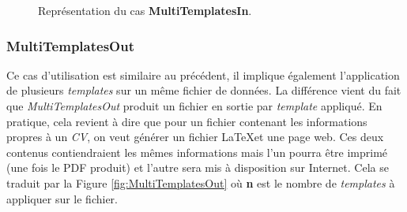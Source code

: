 				\begin{figure}
					\begin{center}
						\caption{Représentation du cas \textbf{MultiTemplatesIn}.}
						\label{fig:MultiTemplatesIn}
					\end{center}
				\end{figure}
				
			
			\subsubsection*{MultiTemplatesOut}
				Ce cas d'utilisation est similaire au précédent, il implique également l'application de plusieurs \textit{templates} sur un même fichier de données. La différence vient du fait que \textit{MultiTemplatesOut} produit un fichier en sortie par \textit{template} appliqué. En pratique, cela revient à dire que pour un fichier contenant les informations propres à un \textit{CV}, on veut générer un fichier \LaTeX et une page web. Ces deux contenus contiendraient les mêmes informations mais l'un pourra être imprimé (une fois le PDF produit) et l'autre sera mis à disposition sur Internet. Cela se traduit par la Figure \ref{fig:MultiTemplatesOut} où \textbf{n} est le nombre de \textit{templates} à appliquer sur le fichier.
				
